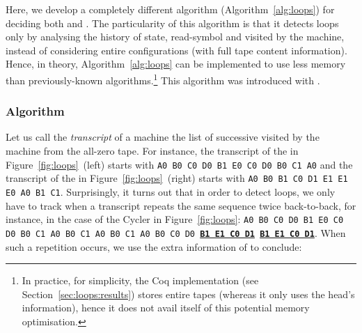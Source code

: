 Here, we develop a completely different algorithm (Algorithm~\ref{alg:loops}) for deciding both \cyclers and \TCs. The particularity of this algorithm is that it detects loops only by analysing the history of state, read-symbol and \headposs visited by the machine, instead of considering entire configurations (\ie with full tape content information). Hence, in theory, Algorithm~\ref{alg:loops} can be implemented to use less memory than previously-known algorithms.\footnote{In practice, for simplicity, the Coq implementation (see Section~\ref{sec:loops:results}) stores entire tapes (whereas it only uses the head's information), hence it does not avail itself of this potential memory optimisation.} This algorithm was introduced with \CoqBB.

\subsubsection{Algorithm}\label{sec:loops:algo}





Let us call the \textit{transcript} of a machine the list of successive \ssps visited by the machine from the all-zero tape. For instance, the transcript of the \cycler in Figure~\ref{fig:loops}~(left) starts with \texttt{A0 B0 C0 D0 B1 E0 C0 D0 B0 C1 A0} and the transcript of the \TC in Figure~\ref{fig:loops}~(right) starts with \texttt{A0 B0 B1 C0 D1 E1 E1 E0 A0 B1 C1}. Surprisingly, it turns out that in order to detect loops, we only have to track when a transcript repeats the same sequence twice back-to-back, for instance, in the case of the Cycler in Figure~\ref{fig:loops}: \texttt{A0 B0 C0 D0 B1 E0 C0 D0 B0 C1 A0 B0 C1 A0 B0 C1 A0 B0 C0 D0 \textbf{\underline{B1 E1 C0 D1}} \textbf{\underline{B1 E1 C0 D1}}}. When such a repetition occurs, we use the extra information of \headpos to conclude:

